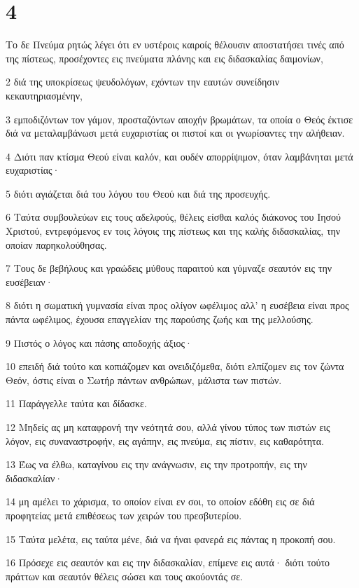 \chapter{4}

\par Το δε Πνεύμα ρητώς λέγει ότι εν υστέροις καιροίς θέλουσιν αποστατήσει τινές από της πίστεως, προσέχοντες εις πνεύματα πλάνης και εις διδασκαλίας δαιμονίων,
\par 2 διά της υποκρίσεως ψευδολόγων, εχόντων την εαυτών συνείδησιν κεκαυτηριασμένην,
\par 3 εμποδιζόντων τον γάμον, προσταζόντων αποχήν βρωμάτων, τα οποία ο Θεός έκτισε διά να μεταλαμβάνωσι μετά ευχαριστίας οι πιστοί και οι γνωρίσαντες την αλήθειαν.
\par 4 Διότι παν κτίσμα Θεού είναι καλόν, και ουδέν απορρίψιμον, όταν λαμβάνηται μετά ευχαριστίας·
\par 5 διότι αγιάζεται διά του λόγου του Θεού και διά της προσευχής.
\par 6 Ταύτα συμβουλεύων εις τους αδελφούς, θέλεις είσθαι καλός διάκονος του Ιησού Χριστού, εντρεφόμενος εν τοις λόγοις της πίστεως και της καλής διδασκαλίας, την οποίαν παρηκολούθησας.
\par 7 Τους δε βεβήλους και γραώδεις μύθους παραιτού και γύμναζε σεαυτόν εις την ευσέβειαν·
\par 8 διότι η σωματική γυμνασία είναι προς ολίγον ωφέλιμος αλλ' η ευσέβεια είναι προς πάντα ωφέλιμος, έχουσα επαγγελίαν της παρούσης ζωής και της μελλούσης.
\par 9 Πιστός ο λόγος και πάσης αποδοχής άξιος·
\par 10 επειδή διά τούτο και κοπιάζομεν και ονειδιζόμεθα, διότι ελπίζομεν εις τον ζώντα Θεόν, όστις είναι ο Σωτήρ πάντων ανθρώπων, μάλιστα των πιστών.
\par 11 Παράγγελλε ταύτα και δίδασκε.
\par 12 Μηδείς ας μη καταφρονή την νεότητά σου, αλλά γίνου τύπος των πιστών εις λόγον, εις συναναστροφήν, εις αγάπην, εις πνεύμα, εις πίστιν, εις καθαρότητα.
\par 13 Έως να έλθω, καταγίνου εις την ανάγνωσιν, εις την προτροπήν, εις την διδασκαλίαν·
\par 14 μη αμέλει το χάρισμα, το οποίον είναι εν σοι, το οποίον εδόθη εις σε διά προφητείας μετά επιθέσεως των χειρών του πρεσβυτερίου.
\par 15 Ταύτα μελέτα, εις ταύτα μένε, διά να ήναι φανερά εις πάντας η προκοπή σου.
\par 16 Πρόσεχε εις σεαυτόν και εις την διδασκαλίαν, επίμενε εις αυτά· διότι τούτο πράττων και σεαυτόν θέλεις σώσει και τους ακούοντάς σε.

